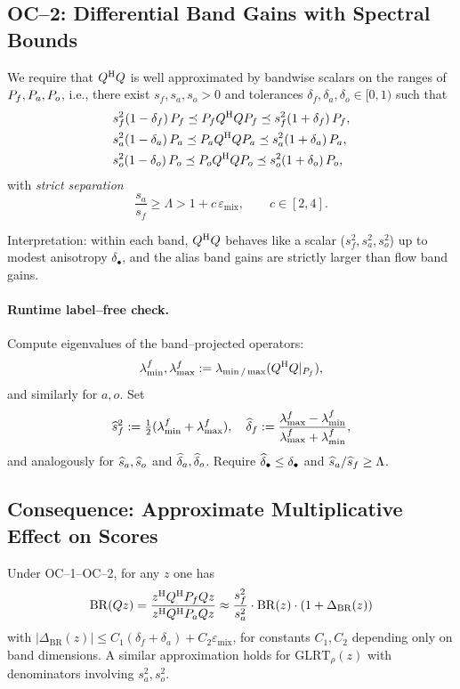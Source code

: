 \subsection{OC--2: Differential Band Gains with Spectral Bounds}

We require that $Q^{\mathrm{H}} Q$ is well approximated by bandwise scalars on the ranges of $P_f,P_a,P_o$, i.e., there exist $s_f,s_a,s_o>0$ and tolerances $\delta_f,\delta_a,\delta_o\in[0,1)$ such that
\begin{align*}
  &s_f^2(1-\delta_f)\,P_f \preceq P_f Q^{\mathrm{H}} Q P_f \preceq s_f^2(1+\delta_f)\,P_f,\\
  &s_a^2(1-\delta_a)\,P_a \preceq P_a Q^{\mathrm{H}} Q P_a \preceq s_a^2(1+\delta_a)\,P_a,\\
  &s_o^2(1-\delta_o)\,P_o \preceq P_o Q^{\mathrm{H}} Q P_o \preceq s_o^2(1+\delta_o)\,P_o,
\end{align*}
with \emph{strict separation}
\[
\frac{s_a}{s_f} \ge \Lambda > 1 + c\,\varepsilon_{\text{mix}},\qquad c\in[2,4].
\]

Interpretation: within each band, $Q^{\mathrm{H}} Q$ behaves like a scalar ($s_f^2,s_a^2,s_o^2$) up to modest anisotropy $\delta_\bullet$, and the alias band gains are strictly larger than flow band gains.

\paragraph{Runtime label--free check.}
Compute eigenvalues of the band--projected operators:
\[
\lambda_{\min}^f,\lambda_{\max}^f := \lambda_{\min/\max}(Q^{\mathrm{H}} Q|_{P_f}),
\]
and similarly for $a,o$. Set
\[
\widehat s_f^2 := \tfrac12(\lambda_{\min}^f + \lambda_{\max}^f),\quad
\widehat\delta_f := \frac{\lambda_{\max}^f - \lambda_{\min}^f}{\lambda_{\max}^f + \lambda_{\min}^f},
\]
and analogously for $\widehat s_a,\widehat s_o$ and $\widehat\delta_a,\widehat\delta_o$. Require $\widehat\delta_\bullet\le\delta_\bullet$ and $\widehat s_a/\widehat s_f \ge \Lambda$.

\subsection{Consequence: Approximate Multiplicative Effect on Scores}

Under OC--1--OC--2, for any $z$ one has
\[
\mathrm{BR}(Qz) = \frac{z^{\mathrm{H}} Q^{\mathrm{H}} P_f Q z}{z^{\mathrm{H}} Q^{\mathrm{H}} P_a Q z}
  \approx \frac{s_f^2}{s_a^2} \cdot \mathrm{BR}(z) \cdot (1+\Delta_{\text{BR}}(z))
\]
with $|\Delta_{\text{BR}}(z)| \le C_1(\delta_f+\delta_a) + C_2 \varepsilon_{\text{mix}}$, for constants $C_1,C_2$ depending only on band dimensions. A similar approximation holds for $\mathrm{GLRT}_\rho(z)$ with denominators involving $s_a^2,s_o^2$.

